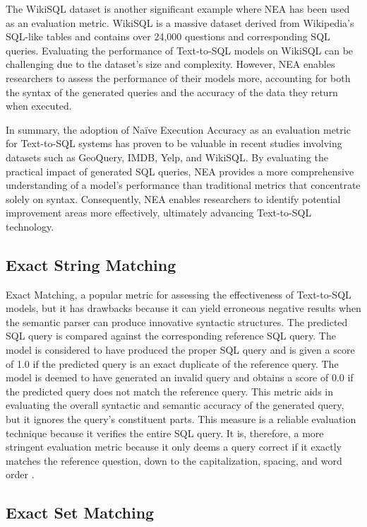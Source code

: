 The WikiSQL dataset is another significant example where NEA has been used as an evaluation metric. WikiSQL is a massive dataset derived from Wikipedia's SQL-like tables and contains over 24,000 questions and corresponding SQL queries. Evaluating the performance of Text-to-SQL models on WikiSQL can be challenging due to the dataset's size and complexity. However, NEA enables researchers to assess the performance of their models more, accounting for both the syntax of the generated queries and the accuracy of the data they return when executed.

In summary, the adoption of Naïve Execution Accuracy as an evaluation metric for Text-to-SQL systems has proven to be valuable in recent studies involving datasets such as GeoQuery, IMDB, Yelp, and WikiSQL. By evaluating the practical impact of generated SQL queries, NEA provides a more comprehensive understanding of a model's performance than traditional metrics that concentrate solely on syntax. Consequently, NEA enables researchers to identify potential improvement areas more effectively, ultimately advancing Text-to-SQL technology.

\subsection{Exact String Matching}

Exact Matching\cite{xu_sqlnet_2017}, a popular metric for assessing the effectiveness of Text-to-SQL models, but it has drawbacks because it can yield erroneous negative results when the semantic parser can produce innovative syntactic structures. The predicted SQL query is compared against the corresponding reference SQL query. The model is considered to have produced the proper SQL query and is given a score of 1.0 if the predicted query is an exact duplicate of the reference query. The model is deemed to have generated an invalid query and obtains a score of 0.0 if the predicted query does not match the reference query. This metric aids in evaluating the overall syntactic and semantic accuracy of the generated query, but it ignores the query's constituent parts. This measure is a reliable evaluation technique because it verifies the entire SQL query. It is, therefore, a more stringent evaluation metric because it only deems a query correct if it exactly matches the reference question, down to the capitalization, spacing, and word order \cite{zhong_semantic_2020}.


\subsection{Exact Set Matching}

